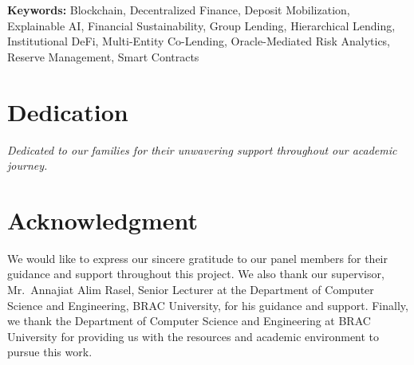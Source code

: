 \documentclass[12pt,a4paper]{report}
\begin{document}
\vspace{0.5em}
\noindent\textbf{Keywords:} Blockchain, Decentralized Finance, Deposit Mobilization, Explainable AI, Financial Sustainability, Group Lending, Hierarchical Lending, Institutional DeFi, Multi-Entity Co-Lending, Oracle-Mediated Risk Analytics, Reserve Management, Smart Contracts

\newpage
\thispagestyle{empty}

\chapter*{Dedication}
{}

\vspace{3cm}
\begin{center}
\textit{Dedicated to our families for their unwavering support throughout our academic journey.}
\end{center}

\newpage
\thispagestyle{empty}

\chapter*{Acknowledgment}
{}

We would like to express our sincere gratitude to our panel members for their guidance and support throughout this project. We also thank our supervisor, Mr.\ Annajiat Alim Rasel, Senior Lecturer at the Department of Computer Science and Engineering, BRAC University, for his guidance and support. Finally, we thank the Department of Computer Science and Engineering at BRAC University for providing us with the resources and academic environment to pursue this work.

\newpage
\singlespacing
\setcounter{page}{1}
\tableofcontents
\newpage
{}
{}
\listoftables
\newpage
{}
{}
\listoffigures
\newpage
\end{document}
